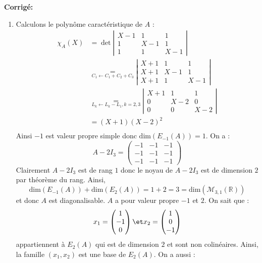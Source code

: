 \documentclass[a4paper,twoside,french,10pt]{VcCours}
\newcommand{\corr}{\textbf{Corrigé:}}
\begin{document}
\corr 
\begin{enumerate}
\item Calculons le polynôme caractéristique de $A$ :
\begin{align*}
\chi_A(X) & =\det \left\vert  \begin{array}{*{20}{c}}
{X - 1}&1&1\\
1&{X - 1}&1\\
1&1&{X - 1}
\end{array}  \right\vert \\
&  \underset{{C_1} \leftarrow {C_1} + {C_2} + {C_3}}{=} \left\vert \begin{array}{*{20}{c}}
{X + 1}&1&1\\
{X + 1}&{X - 1}&1\\
{X + 1}&1&{X - 1} 
\end{array} \right\vert  \\
&  \underset{{L_k} \leftarrow {L_k} - {L_1}, k=2,3}{=}  \left\vert \begin{array}{*{20}{c}}
{X + 1}&1&1\\
0&{X - 2}&0\\
0&0&{X - 2}
\end{array} \right\vert \\
& = \left( {X + 1} \right){\left( {X - 2} \right)^2} \\
\end{align*}
Ainsi $-1$ est valeur propre simple donc $\textrm{dim}(E_{-1}(A))=1$. On a :
$$ A-2I_3 = \left(\begin{array}{ccc}
-1 & -1 & -1\\
-1 & -1 & -1\\
-1 & -1 & -1
\end{array}\right)$$
Clairement $A-2I_3$ est de rang $1$ donc le noyau de $A-2I_3$ est de dimension $2$ par théorème du rang. Ainsi,
$$ \textrm{dim}(E_{-1}(A)) + \textrm{dim}(E_2(A)) = 1+2 = 3 = \textrm{dim}(\mathcal{M}_{3,1}(\mathbb{R}))$$
et donc $A$ est diagonalisable. $A$ a pour valeur propre $-1$ et $2$. On sait que :
$$ x_1= \begin{pmatrix}
1 \\
 -1 \\ 0 
\end{pmatrix} \et x_2=\begin{pmatrix}
1 \\
0 \\
-1
\end{pmatrix}$$
appartiennent à $E_2(A)$ qui est de dimension $2$ et sont non colinéaires. Ainsi, la famille $(x_1,x_2)$ est une base de $E_2(A)$. On a aussi :

\end{enumerate}
\end{document}
